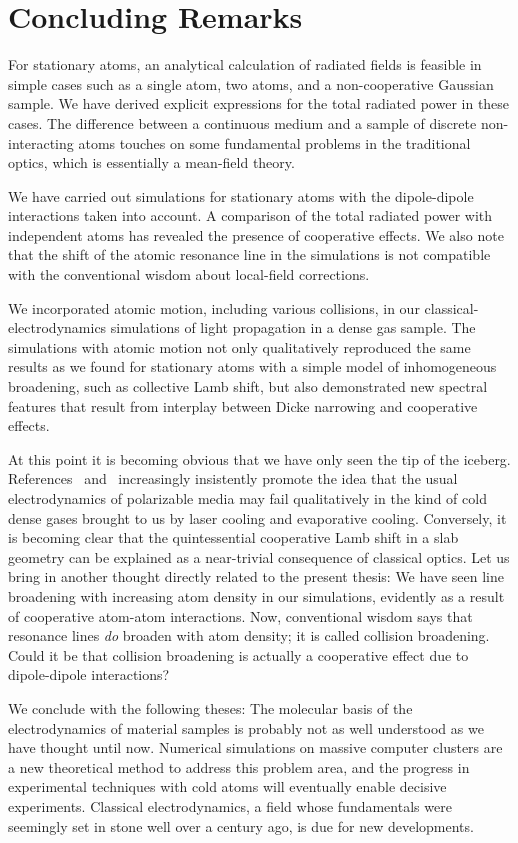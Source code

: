 \chapter{Concluding Remarks}
For stationary atoms, an analytical calculation of radiated fields is feasible in simple cases such as a single atom, two atoms, and a non-cooperative Gaussian sample. We have derived explicit expressions for the total radiated power in these cases. The difference between a continuous medium and a sample of discrete non-interacting atoms touches on some fundamental problems in the traditional optics, which is essentially a mean-field theory.

We have carried out simulations for stationary atoms with the dipole-dipole interactions taken into account. A comparison of the total radiated power with independent atoms has revealed the presence of cooperative effects. We also note that the shift of the atomic resonance line in the simulations is not compatible with the conventional wisdom about local-field corrections.

We incorporated atomic motion, including various collisions, in our classical-electrodynamics simulations of light propagation in a dense gas sample. The simulations with atomic motion not only qualitatively reproduced the same results as we found for stationary atoms with a simple model of inhomogeneous broadening, such as collective Lamb shift, but also demonstrated new spectral features that result from interplay between Dicke narrowing and cooperative effects.

At this point it is becoming obvious that we have only seen the tip of the iceberg. References~\cite{PhysRevLett.112.113603} and~\cite{Javanainen:16} increasingly insistently promote the idea that the usual electrodynamics of polarizable media may fail qualitatively in the kind of cold dense gases brought to us by laser cooling and evaporative cooling. Conversely, it is becoming clear that the quintessential cooperative Lamb shift in a slab geometry can be explained as a near-trivial consequence of classical optics. Let us bring in another thought directly related to the present thesis: We have seen line broadening with increasing atom density in our simulations, evidently as a result of cooperative atom-atom interactions. Now, conventional wisdom says that resonance lines {\em do\/} broaden with atom density; it is called collision broadening. Could it be that collision broadening is actually a cooperative effect due to dipole-dipole interactions?

We conclude with the following theses: The molecular basis of the electrodynamics of material samples is probably not as well understood as we have thought until now. Numerical simulations on massive computer clusters are a new theoretical method to address this problem area, and the progress in experimental techniques with cold atoms will eventually enable decisive experiments. Classical electrodynamics, a field whose fundamentals were seemingly set in stone well over a century ago, is due for new developments.
